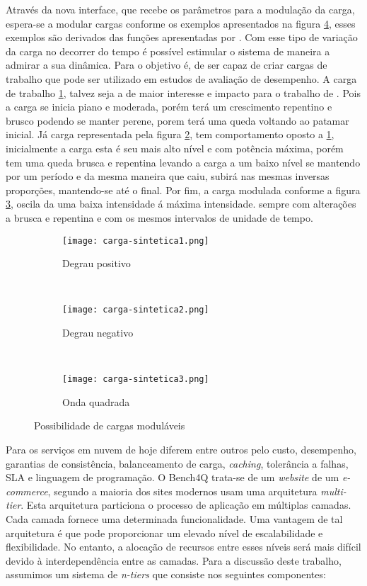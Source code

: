 Através da nova interface, que recebe os parâmetros para a modulação da carga, espera-se a modular cargas conforme os exemplos apresentados na figura	\ref{fig:cargas-moduladas-exemplos}, esses exemplos são derivados das funções apresentadas por . Com esse tipo de variação da carga no decorrer do tempo é possível estimular o sistema de maneira a admirar a sua dinâmica.  Para  o objetivo é, de ser capaz de criar cargas de trabalho que pode ser utilizado em estudos de avaliação de desempenho. 
A carga de trabalho \ref{fig:degrau-positivo}, talvez seja a de maior interesse e impacto para o trabalho de . Pois a carga se inicia piano e moderada, porém terá um crescimento repentino e brusco podendo se manter perene, porem terá uma queda voltando ao patamar inicial. Já carga representada pela figura \ref{fig:degrau-negativo}, tem comportamento oposto a \ref{fig:degrau-positivo}, inicialmente a carga esta é seu mais alto nível e com potência máxima, porém tem uma queda brusca e repentina levando a carga a um baixo nível se mantendo por um período e da mesma maneira que caiu, subirá nas mesmas inversas proporções, mantendo-se até o final. Por fim, a carga modulada conforme a figura \ref{fig:onda-gradrada}, oscila da uma baixa intensidade á máxima intensidade. sempre com alterações a brusca e repentina e com os mesmos intervalos de unidade de tempo.
 
\begin{figure}[!htb]
	\centering
	\begin{subfigure}[b]{0.45\textwidth}
		\texttt{[image: carga-sintetica1.png]}
		\caption{Degrau positivo}
		\label{fig:degrau-positivo}
	\end{subfigure}
	~
	\begin{subfigure}[b]{0.45\textwidth}
		\texttt{[image: carga-sintetica2.png]}
		\caption{Degrau negativo}
		\label{fig:degrau-negativo}
	\end{subfigure}
	~
	\begin{subfigure}[b]{0.45\textwidth}
		\texttt{[image: carga-sintetica3.png]}
		\caption{Onda quadrada}
		\label{fig:onda-gradrada}
	\end{subfigure}
	\caption{Possibilidade de cargas moduláveis}
	\label{fig:cargas-moduladas-exemplos}
\end{figure}


Para  os serviços em nuvem de hoje diferem entre outros pelo custo, desempenho, garantias de consistência, balanceamento de carga, \textit{caching}, tolerância a falhas, SLA e linguagem de programação. O Bench4Q trata-se de um \textit{website} de um \textit{e-commerce}, segundo  a maioria dos sites modernos usam uma arquitetura \textit{multi-tier}. Esta arquitetura particiona o processo de aplicação em múltiplas camadas. Cada camada fornece uma determinada funcionalidade. Uma vantagem de tal arquitetura é que pode proporcionar um elevado nível de escalabilidade e flexibilidade. No entanto, a alocação de recursos entre esses níveis será mais difícil devido à interdependência entre as camadas. Para a discussão deste trabalho, assumimos um sistema de \textit{n-tiers} que consiste nos seguintes componentes:


